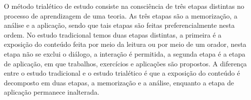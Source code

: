 \documentclass[10pt,a4paper]{report}
\begin{document}











\hspace{\baselineskip}

O método trialético de estudo consiste na consciência de três etapas distintas no processo de aprendizagem de uma teoria. As três etapas são a memorização, a análise e a aplicação, sendo que tais etapas são feitas preferencialmente nesta ordem. No estudo tradicional temos duas etapas distintas, a primeira é a exposição do conteúdo feita por meio da leitura ou por meio de um orador, nesta etapa não se exclui o diálogo, a interação é permitida, a segunda etapa é a etapa de aplicação, em que trabalhos, exercícios e aplicações são propostos. A diferença entre o estudo tradicional e o estudo trialético é que a exposição do conteúdo é decomposto em duas etapas, a memorização e a análise, enquanto a etapa de aplicação permanece inalterada.
\end{document}
